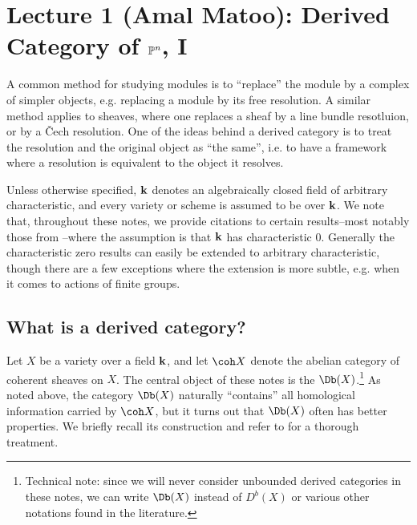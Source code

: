 \documentclass{amsart}
\begin{document}
\fi

\section{Lecture 1 (Amal Matoo): Derived Category of $\mathbb P^n$, I}\label{lec:1-DbPPn}


A common method for studying modules is to ``replace'' the module by a complex of simpler objects, e.g. replacing a module by its free resolution.  A similar method applies to sheaves, where one replaces a sheaf by a line bundle resotluion, or by a \v{C}ech resolution.  One of the ideas behind a derived category is to treat the resolution and the original object as ``the same'', i.e. to have a framework where a resolution is equivalent to the object it resolves.




Unless otherwise specified, ${\bf k}$ denotes an algebraically closed field of arbitrary characteristic, and every variety or scheme is assumed to be over ${\bf k}$.  We note that, throughout these notes, we provide citations to certain results--most notably those from \cite{CLS2011}--where the assumption is that ${\bf k}$ has characteristic $0$.  Generally the characteristic zero results can  easily be extended to arbitrary characteristic, though there are a few exceptions where the extension is more subtle, e.g. when it comes to actions of finite groups.

\subsection{What is a derived category?}
Let $X$ be a variety over a field ${\bf k}$, and let $\coh X$ denote the abelian category of coherent sheaves on $X$. The central object of these notes is the  $\Db(X)$.\footnote{Technical note: since we will never consider unbounded derived categories in these notes, we can write $\Db(X)$ instead of $D^b(X)$ or various other notations found in the literature.}  As noted above, the category $\Db(X)$ naturally ``contains'' all homological information carried by $\coh X$, but it turns out that $\Db(X)$ often has better properties. We briefly recall its construction and refer to \cite{Huybrechts2006} for a thorough treatment.
\end{document}
